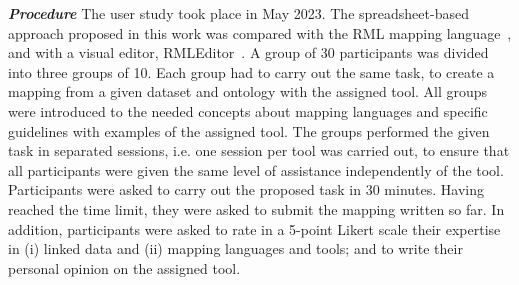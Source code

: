 

\noindent\textit{\textbf{Procedure}} 
The user study took place in May 2023. %
The spreadsheet-based approach proposed in this work was compared with the RML mapping language~\parencite{Dimou2014rml}, and with a visual editor, RMLEditor~\parencite{heyvaert2016rmleditor}. A group of 30 participants was divided into three groups of 10. Each group had to carry out the same task, to create a mapping from a given dataset and ontology with the assigned tool. All groups were introduced to the needed concepts about mapping languages and specific guidelines with examples of the assigned tool. The groups performed the given task in separated sessions, i.e. one session per tool was carried out, to ensure that all participants were given the same level of assistance independently of the tool. Participants were asked to carry out the proposed task in 30 minutes. Having reached the time limit, they were asked to submit the mapping written so far. In addition, participants were asked to rate in a 5-point Likert scale their expertise in (i) linked data and (ii) mapping languages and tools; and to write their personal opinion on the assigned tool.


